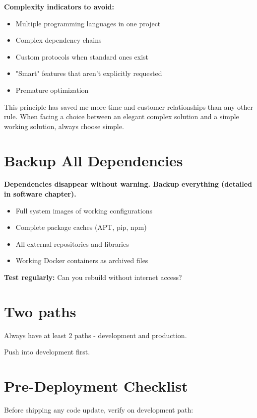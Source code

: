 \textbf{Complexity indicators to avoid:}
\begin{itemize}
\item Multiple programming languages in one project
\item Complex dependency chains
\item Custom protocols when standard ones exist
\item "Smart" features that aren't explicitly requested
\item Premature optimization
\end{itemize}

This principle has saved me more time and customer relationships than any other rule. When facing a choice between an elegant complex solution and a simple working solution, always choose simple.


\section{Backup All Dependencies}

\textbf{Dependencies disappear without warning. Backup everything (detailed in software chapter).}

\begin{itemize}
\item Full system images of working configurations
\item Complete package caches (APT, pip, npm)
\item All external repositories and libraries
\item Working Docker containers as archived files
\end{itemize}

\textbf{Test regularly:} Can you rebuild without internet access?

\section{Two paths}
Always have at least 2 paths - development and production.

Push into development first.

\section{Pre-Deployment Checklist}

Before shipping any code update, verify on development path:

